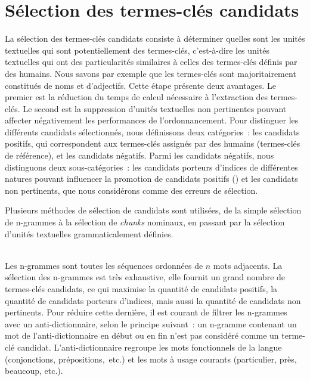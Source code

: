   \section{Sélection des termes-clés candidats}
  \label{sec:main-state_of_the_art-keyphrase_candidate_selection}
    La sélection des termes-clés candidats consiste à déterminer
    quelles sont les unités textuelles qui sont potentiellement des termes-clés,
    c'est-à-dire les unités textuelles qui ont des particularités similaires à
    celles des termes-clés définis par des humains. Nous savons par exemple que
    les termes-clés sont majoritairement constitués de noms et d'adjectifs.
    Cette étape présente deux avantages. Le premier est la réduction du temps de
    calcul nécessaire à l'extraction des  termes-clés. Le second est la
    suppression d'unités textuelles non pertinentes pouvant affecter
    négativement les performances de l'ordonnancement. Pour distinguer les
    différents candidats sélectionnés, nous définissons deux catégories~: les
    candidats positifs, qui correspondent aux termes-clés assignés par des
    humains (termes-clés de référence), et les candidats négatifs. Parmi les
    candidats négatifs, nous distinguons deux sous-catégories~: les candidats
    porteurs d'indices de différentes natures pouvant
    influencer la promotion de candidats positifs () et les
    candidats non pertinents, que nous considérons comme des
    erreurs de sélection.

    Plusieurs méthodes de sélection de candidats sont utilisées, de la simple
    sélection de n-grammes à la sélection de \textit{chunks} nominaux, en
    passant par la sélection d'unités textuelles grammaticalement définies.

    ~\\Les n-grammes sont toutes
    les séquences ordonnées de $n$ mots adjacents. La sélection des n-grammes
    est très exhaustive, elle fournit un grand nombre de termes-clés candidats,
    ce qui maximise la quantité de candidats positifs, la quantité de candidats
    porteurs d'indices, mais aussi la quantité de candidats non pertinents. Pour
    réduire cette dernière, il est courant de filtrer les n-grammes avec un
    anti-dictionnaire, selon le principe suivant~: un n-gramme
    contenant un mot de l'anti-dictionnaire en début ou en fin n'est pas
    considéré comme un terme-clé candidat. L'anti-dictionnaire regroupe les mots
    fonctionnels de la langue (conjonctions, prépositions,~etc.) et les mots à
    usage courants (\og{}particulier\fg{}, \og{}près\fg{}, \og{}beaucoup\fg{},
    etc.).
    

